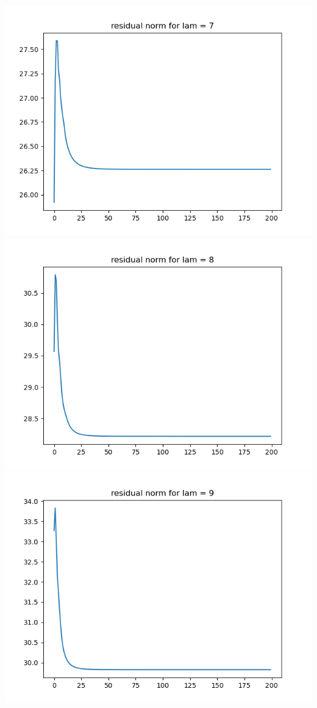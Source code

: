 \documentclass{article}
\begin{document}
\begin{enumerate}
\begin{enumerate}
\begin{center}
			\includegraphics[scale=.3]{hw7p1b residual norm for lamcount = 12}
			\includegraphics[scale=.3]{hw7p1b residual norm for lamcount = 13}
			\includegraphics[scale=.3]{hw7p1b residual norm for lamcount = 14}

\end{center}
\end{enumerate}
\end{enumerate}
\end{document}
